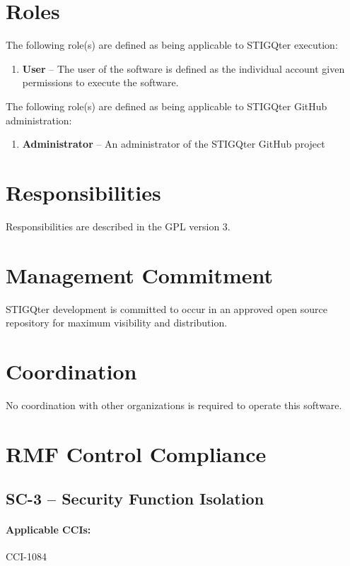 \documentclass[letterpaper, 10pt, twoside]{article}
\begin{document}
\section{Roles}
\label{sec:roles}

The following role(s) are defined as being applicable to STIGQter execution:
\begin{enumerate}
	\item \textbf{User} -- The user of the software is defined as the individual account given permissions to execute the software.
\end{enumerate}

The following role(s) are defined as being applicable to STIGQter GitHub administration:
\begin{enumerate}
	\item \textbf{Administrator} -- An administrator of the STIGQter GitHub project
\end{enumerate}

\section{Responsibilities}
\label{sec:responsibilities}

Responsibilities are described in the GPL version 3.

\section{Management Commitment}

STIGQter development is committed to occur in an approved open source repository for maximum visibility and distribution.

\section{Coordination}

No coordination with other organizations is required to operate this software.

\section{RMF Control Compliance}

\subsection{SC-3 -- Security Function Isolation}

\paragraph{Applicable CCIs:} CCI-1084
\end{document}
